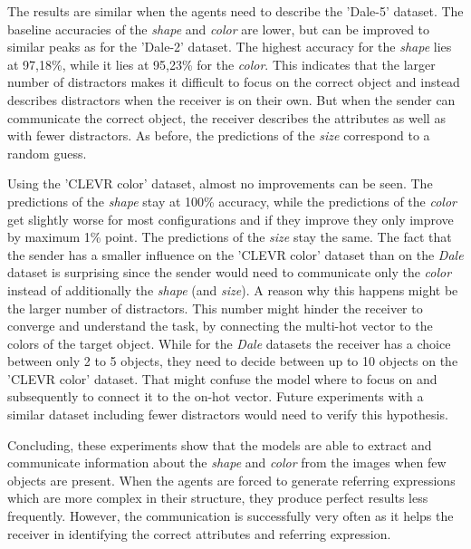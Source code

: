 The results are similar when the agents need to describe the 'Dale-5' dataset.
The baseline accuracies of the \emph{shape} and \emph{color} are lower, but can be improved to similar peaks as for the 'Dale-2' dataset.
The highest accuracy for the \emph{shape} lies at 97,18\%, while it lies at 95,23\% for the \emph{color}.
This indicates that the larger number of distractors makes it difficult to focus on the correct object and instead describes distractors when the receiver is on their own.
But when the sender can communicate the correct object, the receiver describes the attributes as well as with fewer distractors.
As before, the predictions of the \emph{size} correspond to a random guess.

Using the 'CLEVR color' dataset, almost no improvements can be seen.
The predictions of the \emph{shape} stay at 100\% accuracy, while the predictions of the \emph{color} get slightly worse for most configurations and if they improve they only improve by maximum 1\% point.
The predictions of the \emph{size} stay the same.
The fact that the sender has a smaller influence on the 'CLEVR color' dataset than on the \emph{Dale} dataset is surprising since the sender would need to communicate only the \emph{color} instead of additionally the \emph{shape} (and \emph{size}).
A reason why this happens might be the larger number of distractors.
This number might hinder the receiver to converge and understand the task, by connecting the multi-hot vector to the colors of the target object.
While for the \emph{Dale} datasets the receiver has a choice between only 2 to 5 objects, they need to decide between up to 10 objects on the 'CLEVR color' dataset.
That might confuse the model where to focus on and subsequently to connect it to the on-hot vector.
Future experiments with a similar dataset including fewer distractors would need to verify this hypothesis.

Concluding, these experiments show that the models are able to extract and communicate information about the \emph{shape} and \emph{color} from the images when few objects are present.
When the agents are forced to generate referring expressions which are more complex in their structure, they produce perfect results less frequently.
However, the communication is successfully very often as it helps the receiver in identifying the correct attributes and referring expression.